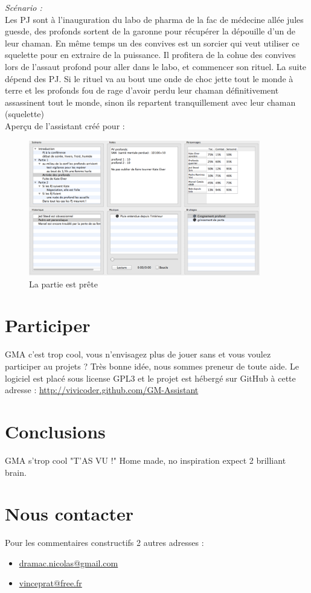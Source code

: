 \documentclass[12pt]{article}
\begin{document}
\emph{Scénario :}\\ 
Les PJ sont à l'inauguration du labo de pharma de la fac de médecine allée jules guesde, des profonds sortent de la garonne pour récupérer la dépouille d'un de leur chaman.
En même temps un des convives est un sorcier qui veut utiliser ce squelette pour en extraire de la puissance. Il profitera de la cohue des convives lors de l'assaut profond pour aller dans le labo, et commencer son rituel. La suite dépend des PJ. Si le rituel va au bout une onde de choc jette tout le monde à terre et les profonds fou de rage d'avoir perdu leur chaman définitivement assassinent tout le monde, sinon ils repartent tranquillement avec leur chaman (squelette)
\\
Aperçu de l'assistant créé pour :
\begin{figure}[h]
    \includegraphics[width=0.9\textwidth]{screen_scenar_exemple}
    \caption{La partie est prête}
\end{figure}

\section{Participer}\label{participer}
GMA c'est trop cool, vous n'envisagez plus de jouer sans et vous voulez participer au projets ?
Très bonne idée, nous sommes preneur de toute aide.
Le logiciel est placé sous license GPL3 et le projet est hébergé sur GitHub à cette adresse :
\href{http://vivicoder.github.com/GM-Assistant}{http://vivicoder.github.com/GM-Assistant}

\section{Conclusions}\label{conclusions}
GMA s'trop cool "T'AS VU !"
Home made, no inspiration expect 2 brilliant brain.

\section*{Nous contacter}
Pour les commentaires constructifs 2 autres adresses :
\begin{itemize}
    \item \href{mailto:dramac.nicolas@gmail.com}{dramac.nicolas@gmail.com}
    \item \href{mailto:vinceprat@free.fr}{vinceprat@free.fr}
\end{itemize}
\end{document}
